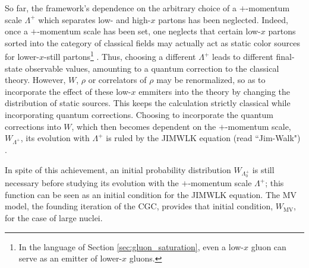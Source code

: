 So far, the framework's dependence on the arbitrary choice of a $+$-momentum scale $\Lambda^+$ which separates low- and high-$x$ partons has been neglected. Indeed, once a $+$-momentum scale has been set, one neglects that certain low-$x$ partons sorted into the category of classical fields may actually act as static color sources for lower-$x$-still partons\footnote{In the language of Section \ref{sec:gluon_saturation}, even a low-$x$ gluon can serve as an emitter of lower-$x$ gluons.} \cite{Albacete_2014}. 
Thus, choosing a different $\Lambda^+$ leads to different final-state observable values, amounting to a quantum correction to the classical theory.
However, $W$, $\rho$ or correlators of $\rho$ may be renormalized, so as to incorporate the effect of these low-$x$ emmiters into the theory by changing the distribution of static sources. 
This keeps the calculation strictly classical while incorporating quantum corrections. \citep{Albacete_2014}
Choosing to incorporate the quantum corrections into $W$, which then becomes dependent on the $+$-momentum scale, $W_{\Lambda^+}$, its evolution with $\Lambda^+$ is ruled by the \gls{JIMWLK} equation (read ``Jim-Walk") \cite{Gelis_2010}.

In spite of this achievement, an initial probability distribution $W_{\Lambda^+_0}$ is still necessary before studying its evolution with the $+$-momentum scale $\Lambda^+$; this function can be seen as an initial condition for the \gls{JIMWLK} equation. The \gls{MV} model, the founding iteration of the \gls{CGC}, provides that initial condition, $W_{\text{MV}}$, for the case of large nuclei.


